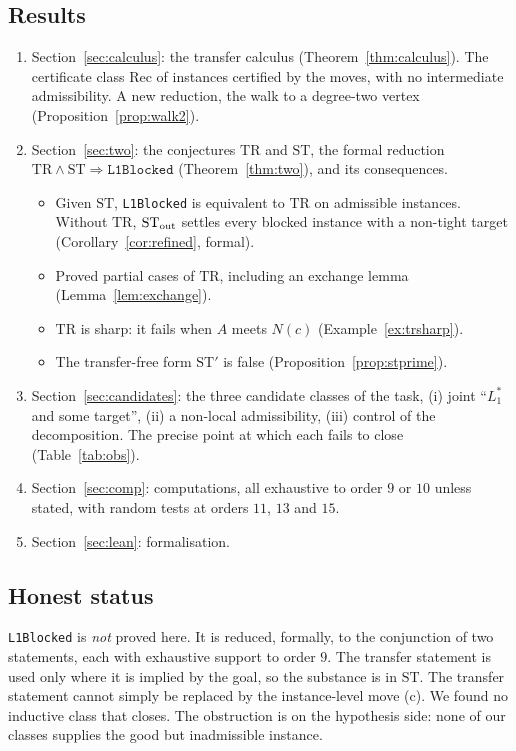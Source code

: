 \documentclass[11pt]{amsart}
\theoremstyle{definition}
\newcommand{\TR}{\mathrm{TR}}
\newcommand{\ST}{\mathrm{ST}}
\begin{document}
\subsection*{Results}
\begin{enumerate}
\item Section~\ref{sec:calculus}: the transfer calculus (Theorem~\ref{thm:calculus}). The
certificate class $\mathrm{Rec}$ of instances certified by the moves, with no intermediate
admissibility. A new reduction, the walk to a degree-two vertex (Proposition~\ref{prop:walk2}).
\item Section~\ref{sec:two}: the conjectures $\TR$ and $\ST$, the formal reduction
$\TR\wedge\ST\Rightarrow\texttt{L1Blocked}$ (Theorem~\ref{thm:two}), and its consequences.
\begin{itemize}
\item Given $\ST$, \texttt{L1Blocked} is equivalent to $\TR$ on admissible instances. Without
$\TR$, $\ST_{\rm out}$ settles every blocked instance with a non-tight target
(Corollary~\ref{cor:refined}, formal).
\item Proved partial cases of $\TR$, including an exchange lemma (Lemma~\ref{lem:exchange}).
\item $\TR$ is sharp: it fails when $A$ meets $N(c)$ (Example~\ref{ex:trsharp}).
\item The transfer-free form $\ST'$ is false (Proposition~\ref{prop:stprime}).
\end{itemize}
\item Section~\ref{sec:candidates}: the three candidate classes of the task, (i) joint
``$L_1^*$ and some target'', (ii) a non-local admissibility, (iii) control of the decomposition. The
precise point at which each fails to close (Table~\ref{tab:obs}).
\item Section~\ref{sec:comp}: computations, all exhaustive to order $9$ or $10$ unless stated, with
random tests at orders $11$, $13$ and $15$.
\item Section~\ref{sec:lean}: formalisation.
\end{enumerate}

\subsection*{Honest status}
\texttt{L1Blocked} is \emph{not} proved here. It is reduced, formally, to the conjunction of two
statements, each with exhaustive support to order $9$. The transfer statement is used only where it
is implied by the goal, so the substance is in $\ST$. The transfer statement cannot simply be
replaced by the instance-level move (c). We found no inductive class that closes. The obstruction is
on the hypothesis side: none of our classes supplies the good but inadmissible instance.
\end{document}
